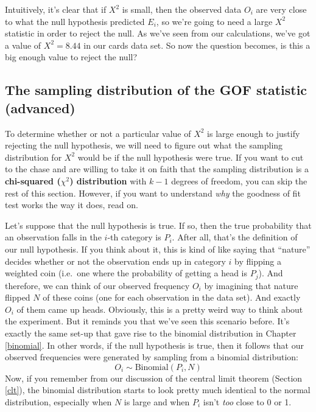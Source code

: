 \documentclass[
  11pt,
  a4paper,
  twoside,symmetric,openright]{book}
\theoremstyle{break}
\theoremstyle{break}
\begin{document}
Intuitively, it's clear that if \(X^2\) is small, then the observed data \(O_i\) are very close to what the null hypothesis predicted \(E_i\), so we're going to need a large \(X^2\) statistic in order to reject the null. As we've seen from our calculations, we've got a value of \(X^2 = 8.44\) in our cards data set. So now the question becomes, is this a big enough value to reject the null?

\subsection{The sampling distribution of the GOF statistic (advanced)}\label{the-sampling-distribution-of-the-gof-statistic-advanced}

To determine whether or not a particular value of \(X^2\) is large enough to justify rejecting the null hypothesis, we will need to figure out what the sampling distribution for \(X^2\) would be if the null hypothesis were true. If you want to cut to the chase and are willing to take it on faith that the sampling distribution is a \textbf{chi-squared (\(\chi^2\)) distribution} with \(k-1\) degrees of freedom, you can skip the rest of this section. However, if you want to understand \emph{why} the goodness of fit test works the way it does, read on.

Let's suppose that the null hypothesis is true. If so, then the true probability that an observation falls in the \(i\)-th category is \(P_i\). After all, that's the definition of our null hypothesis. If you think about it, this is kind of like saying that ``nature'' decides whether or not the observation ends up in category \(i\) by flipping a weighted coin (i.e.~one where the probability of getting a head is \(P_j\)). And therefore, we can think of our observed frequency \(O_i\) by imagining that nature flipped \(N\) of these coins (one for each observation in the data set). And exactly \(O_i\) of them came up heads. Obviously, this is a pretty weird way to think about the experiment. But it reminds you that we've seen this scenario before. It's exactly the same set-up that gave rise to the binomial distribution in Chapter \ref{binomial}. In other words, if the null hypothesis is true, then it follows that our observed frequencies were generated by sampling from a binomial distribution:
\[
O_i \sim \mbox{Binomial}(P_i, N)
\]
Now, if you remember from our discussion of the central limit theorem (Section \ref{clt}), the binomial distribution starts to look pretty much identical to the normal distribution, especially when \(N\) is large and when \(P_i\) isn't \emph{too} close to 0 or 1.
\end{document}
